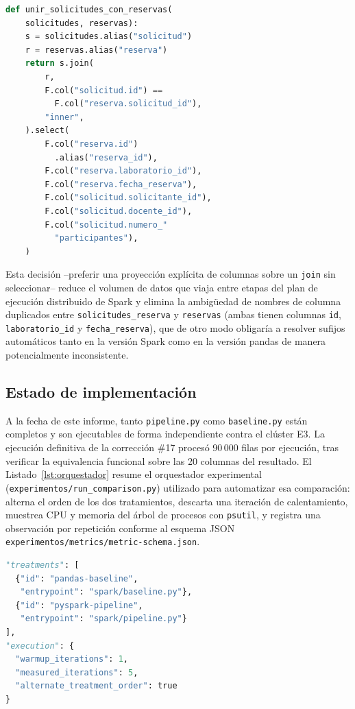 \documentclass[10pt,twocolumn]{article}
\begin{document}
\begin{lstlisting}[language=Python,caption={Combinación explícita de columnas en \texttt{pipeline.py}.},label={lst:join}]
def unir_solicitudes_con_reservas(
    solicitudes, reservas):
    s = solicitudes.alias("solicitud")
    r = reservas.alias("reserva")
    return s.join(
        r,
        F.col("solicitud.id") ==
          F.col("reserva.solicitud_id"),
        "inner",
    ).select(
        F.col("reserva.id")
          .alias("reserva_id"),
        F.col("reserva.laboratorio_id"),
        F.col("reserva.fecha_reserva"),
        F.col("solicitud.solicitante_id"),
        F.col("solicitud.docente_id"),
        F.col("solicitud.numero_"
          "participantes"),
    )
\end{lstlisting}

Esta decisión --preferir una proyección explícita de columnas sobre un
\texttt{join} sin seleccionar-- reduce el volumen de datos que viaja entre
etapas del plan de ejecución distribuido de Spark y elimina la ambigüedad
de nombres de columna duplicados entre \texttt{solicitudes\_reserva} y
\texttt{reservas} (ambas tienen columnas \texttt{id},
\texttt{laboratorio\_id} y \texttt{fecha\_reserva}), que de otro modo
obligaría a resolver sufijos automáticos tanto en la versión Spark como en
la versión pandas de manera potencialmente inconsistente.

\subsection{Estado de implementación}

A la fecha de este informe, tanto \texttt{pipeline.py} como
\texttt{baseline.py} están completos y son ejecutables de forma
independiente contra el clúster E3. La ejecución definitiva de la corrección
\#17 procesó 90\,000 filas por ejecución, tras verificar la equivalencia
funcional sobre las 20 columnas del resultado. El
Listado~\ref{lst:orquestador} resume el orquestador experimental
(\texttt{experimentos/run\_comparison.py}) utilizado para automatizar esa
comparación: alterna el orden de los dos tratamientos,
descarta una iteración de calentamiento, muestrea CPU y memoria del árbol
de procesos con \texttt{psutil}, y registra una observación por repetición
conforme al esquema JSON \texttt{experimentos/metrics/metric-schema.json}.

\begin{lstlisting}[language=Python,caption={Firma de los tratamientos configurados en \texttt{experiment-config.json}.},label={lst:orquestador}]
"treatments": [
  {"id": "pandas-baseline",
   "entrypoint": "spark/baseline.py"},
  {"id": "pyspark-pipeline",
   "entrypoint": "spark/pipeline.py"}
],
"execution": {
  "warmup_iterations": 1,
  "measured_iterations": 5,
  "alternate_treatment_order": true
}
\end{lstlisting}
\end{document}
